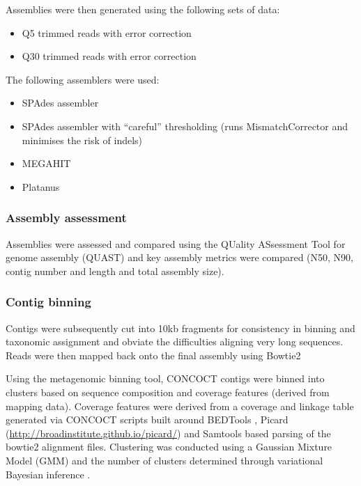 Assemblies were then generated using the following sets
of data:
\begin{itemize}
    \item Q5 trimmed reads with error correction
    \item Q30 trimmed reads with error correction
\end{itemize}
The following assemblers were used:
\begin{itemize}
    \item SPAdes assembler \citep{Bankevich2012,Nurk2013}
    \item SPAdes assembler with ``careful'' thresholding (runs MismatchCorrector and minimises the risk 
        of indels)
    \item MEGAHIT \citep{Li2015a}
    \item Platanus \citep{Kajitani2014}
\end{itemize}

\subsubsection{Assembly assessment}

Assemblies were assessed and compared using the
QUality ASsessment Tool for genome assembly (QUAST) \citep{Gurevich2013a}
and key assembly metrics were compared (N50, N90, contig number
and length and total assembly size).


\subsubsection{Contig binning}
Contigs were subsequently cut into 10kb fragments for consistency
in binning and taxonomic assignment and obviate the difficulties
aligning very long sequences. 
Reads were then mapped back onto the final assembly using Bowtie2 
\citep{Langmead2012} 

Using the metagenomic binning tool, CONCOCT \citep{Alneberg2014}
contigs were binned into clusters based on sequence composition
and coverage features (derived from mapping data).
Coverage features were derived from a coverage and linkage table
generated via CONCOCT scripts built 
around BEDTools \citep{Quinlan2010,Quinlan2014}, 
Picard (\url{http://broadinstitute.github.io/picard/})
and Samtools \citep{Li2009} 
based parsing
of the bowtie2 alignment files.
Clustering was conducted using a Gaussian Mixture Model (GMM) \citep{Bishop2006}
and the number of clusters determined through variational Bayesian inference \citep{Corduneanu2001}.


